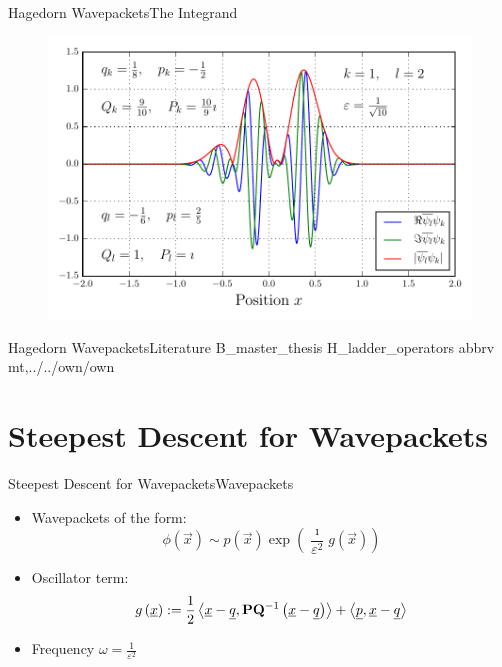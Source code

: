 \documentclass{beamer}
\begin{document}
\begin{frame}{Hagedorn Wavepackets}{The Integrand}
  \begin{figure}
    \centering
    \includegraphics[width=0.8\linewidth]{./fig/overlap_integrand.pdf}
  \end{figure}
\end{frame}


\begin{frame}{Hagedorn Wavepackets}{Literature}
  \nocite{hawp}{B_master_thesis}
  \nocite{hawp}{H_ladder_operators}
  \scriptsize
  {abbrv}
  {mt,../../own/own}{}
\end{frame}


\section{Steepest Descent for Wavepackets}


\begin{frame}{Steepest Descent for Wavepackets}{Wavepackets}
  \begin{itemize}
    \item Wavepackets of the form:
    \begin{equation*}
      \phi(\vec{x}) \sim p\left(\vec{x}\right)\exp\left(\frac{\imath}{\varepsilon^2} g\left(\vec{x}\right)\right)
    \end{equation*}
    \item Oscillator term:
    \begin{equation*}
      g\left(\underline{x}\right)
      :=
      \frac{1}{2} \left\langle \underline{x}-\underline{q} , \mathbf{P}\mathbf{Q}{}^{-1} \left(\underline{x}-\underline{q}\right) \right\rangle
      +
      \left\langle \underline{p} , \underline{x}-\underline{q} \right\rangle
    \end{equation*}
    \item Frequency $\omega = \frac{1}{\varepsilon^2}$
  \end{itemize}
\end{frame}
\end{document}
